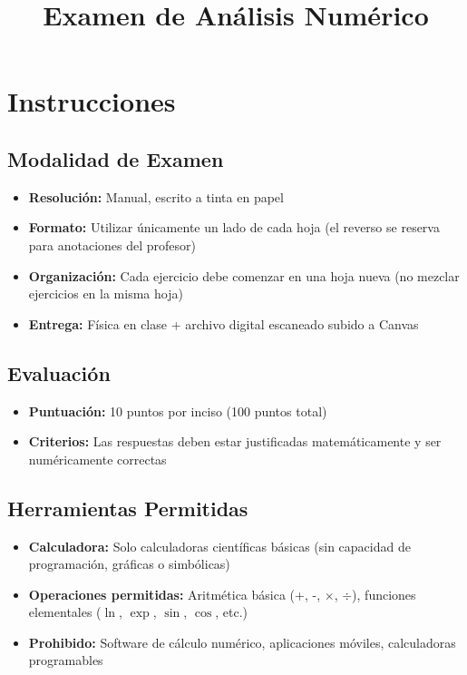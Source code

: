 \documentclass[12pt,a4paper]{article}
\title{\textbf{Examen de Análisis Numérico}}
\author{}
\date{}
\begin{document}
\maketitle

\section*{Instrucciones}

\subsection*{Modalidad de Examen}
\begin{itemize}
\item \textbf{Resolución:} Manual, escrito a tinta en papel
\item \textbf{Formato:} Utilizar únicamente un lado de cada hoja (el reverso se reserva para anotaciones del profesor)
\item \textbf{Organización:} Cada ejercicio debe comenzar en una hoja nueva (no mezclar ejercicios en la misma hoja)
\item \textbf{Entrega:} Física en clase + archivo digital escaneado subido a Canvas
\end{itemize}

\subsection*{Evaluación}
\begin{itemize}
\item \textbf{Puntuación:} 10 puntos por inciso (100 puntos total)
\item \textbf{Criterios:} Las respuestas deben estar justificadas matemáticamente y ser numéricamente correctas
\end{itemize}

\subsection*{Herramientas Permitidas}
\begin{itemize}
\item \textbf{Calculadora:} Solo calculadoras científicas básicas (sin capacidad de programación, gráficas o simbólicas)
\item \textbf{Operaciones permitidas:} Aritmética básica (+, -, \(\times\), \(\div\)), funciones elementales (\(\ln\), \(\exp\), \(\sin\), \(\cos\), etc.)
\item \textbf{Prohibido:} Software de cálculo numérico, aplicaciones móviles, calculadoras programables
\end{itemize}
\end{document}
